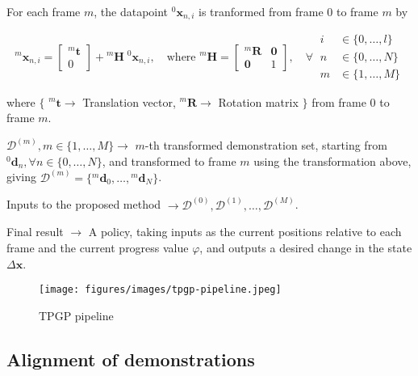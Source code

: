 For each frame \( m \), the datapoint \( {}^{0}\boldsymbol{x}_{n, i} \) is tranformed from frame \( 0 \) to frame \( m \) by

\begin{equation}
    {}^{m}\boldsymbol{x}_{n, i}
    =
    \begin{bmatrix}
        {}^{m}\boldsymbol{t} \\
        0
    \end{bmatrix}
    +
    {}^{m}\boldsymbol{H} \; {}^{0}\boldsymbol{x}_{n, i}
    , \quad
    \text{where }
    {}^{m}\boldsymbol{H}
    =
    \begin{bmatrix}
        {}^{m}\boldsymbol{R} & \boldsymbol{0} \\
        \boldsymbol{0}       & 1
    \end{bmatrix}
    , \quad \forall \
    \begin{aligned}
        i & \in \{ 0, \ldots, l \} \\
        n & \in \{ 0, \ldots, N \} \\
        m & \in \{ 1, \ldots, M \}
    \end{aligned}
\end{equation}

where \( \big \{ \)
\( {}^{m}\boldsymbol{t} \to \) Translation vector, \( {}^{m}\boldsymbol{R} \to \) Rotation matrix \( \big \} \) from frame \( 0 \) to frame \( m \).

\( \mathcal{D}^{(m)}, m \in \{ 1, \ldots, M \} \to \) \( m \)-th transformed demonstration set, starting from \( {}^{0}\boldsymbol{d}_n, \forall n \in \{ 0, \ldots, N \} \), and transformed to frame \( m \) using the transformation above, giving \( \mathcal{D}^{(m)} = \{ {}^{m}\boldsymbol{d}_0, \ldots, {}^{m}\boldsymbol{d}_N \} \).

Inputs to the proposed method \( \to \mathcal{D}^{(0)}, \mathcal{D}^{(1)}, \ldots, \mathcal{D}^{(M)} \).

Final result \( \to \) A policy, taking inputs as the current positions relative to each frame and the current progress value \( \varphi \), and outputs a desired change in the state \( \Delta \boldsymbol{x} \).

\begin{figure}[htbp]
    \centering
    \texttt{[image: figures/images/tpgp-pipeline.jpeg]}
    \caption{
        TPGP pipeline
    }\label{fig:tpgp-pipeline}
\end{figure}

\subsection{Alignment of demonstrations}\label{sec:alignment}

